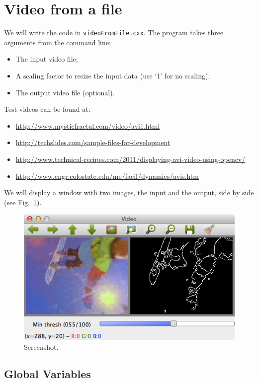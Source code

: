 \documentclass[english,a4paper,12pt,oneside]{article}
\begin{document}
\section{Video from a file}
 
We will write the code in \verb+videoFromFile.cxx+.
The program takes three arguments from the command line:
\begin{itemize}
  \item The input video file;
  \item A scaling factor to resize the input data (use `1' for no scaling);
  \item The output video file (optional).
\end{itemize}

Test videos can be found at:
\begin{itemize}
\item \url{http://www.mysticfractal.com/video/avi1.html}
\item \url{http://techslides.com/sample-files-for-development}
\item \url{http://www.technical-recipes.com/2011/displaying-avi-video-using-opencv/}
\item \url{http://www.engr.colostate.edu/me/facil/dynamics/avis.htm}
\end{itemize}

We will display a window with two images, the input and the output, side by side (see Fig.~\ref{fig:screenshot}).
 \begin{figure}[htbp]
  \centering
  \includegraphics[width=0.7\linewidth]{screenshot1}
  \caption{\label{fig:screenshot}Screenshot.}
 \end{figure}

\subsection{Global Variables}
\end{document}
